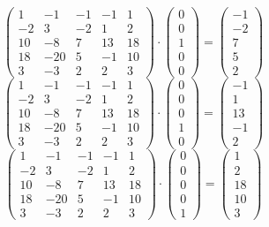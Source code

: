 \documentclass[a4paper,12pt]{article}
\begin{document}
\[
\left(\begin{matrix}
1 & -1 & -1 & -1 & 1 \\
-2 & 3 & -2 & 1 & 2 \\
10 & -8 & 7 & 13 & 18 \\
18 & -20 & 5 & -1 & 10 \\
3 & -3 & 2 & 2 & 3
\end{matrix}\right)
\cdot
\left(\begin{matrix}
0 \\
0 \\
1 \\
0 \\
0
\end{matrix}\right)
=
\left(\begin{matrix}
-1 \\
-2 \\
7 \\
5 \\
2
\end{matrix}\right)
\]
\[
\left(\begin{matrix}
1 & -1 & -1 & -1 & 1 \\
-2 & 3 & -2 & 1 & 2 \\
10 & -8 & 7 & 13 & 18 \\
18 & -20 & 5 & -1 & 10 \\
3 & -3 & 2 & 2 & 3
\end{matrix}\right)
\cdot
\left(\begin{matrix}
0 \\
0 \\
0 \\
1  \\
0
\end{matrix}\right)
=
\left(\begin{matrix}
-1 \\
1 \\
13 \\
-1 \\
2
\end{matrix}\right)
\]
\[
\left(\begin{matrix}
1 & -1 & -1 & -1 & 1 \\
-2 & 3 & -2 & 1 & 2 \\
10 & -8 & 7 & 13 & 18 \\
18 & -20 & 5 & -1 & 10 \\
3 & -3 & 2 & 2 & 3
\end{matrix}\right)
\cdot
\left(\begin{matrix}
0 \\
0 \\
0 \\
0  \\
1
\end{matrix}\right)
=
\left(\begin{matrix}
1 \\
2 \\
18 \\
10 \\
3
\end{matrix}\right)
\]
\end{document}
